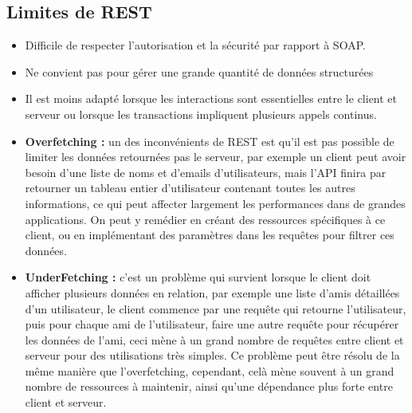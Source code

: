 \subsection{Limites de REST}
\begin{itemize}
	\item Difficile de respecter l'autorisation et la sécurité par rapport à SOAP.
	\item Ne convient pas pour gérer une grande quantité de données structurées
	\item Il est moins adapté lorsque les interactions sont essentielles entre le client et serveur ou lorsque les transactions impliquent plusieurs appels continus.
	\item \textbf{Overfetching :} un des inconvénients de REST est qu'il est pas possible de limiter les données retournées pas le serveur, par exemple un client peut avoir besoin d'une liste de noms et d'emails d'utilisateurs, mais l'API finira par retourner un tableau entier d'utilisateur contenant toutes les autres informations, ce qui peut affecter largement les performances dans de grandes applications. On peut y remédier en créant des ressources spécifiques à ce client, ou en implémentant des paramètres dans les requêtes pour filtrer ces données.
	\item \textbf{UnderFetching :} c'est un problème qui survient lorsque le client doit afficher plusieurs données en relation, par exemple une liste d'amis détaillées d'un utilisateur, le client commence par une requête qui retourne l'utilisateur, puis pour chaque ami de l'utilisateur, faire une autre requête pour récupérer les données de l'ami, ceci mène à un grand nombre de requêtes entre client et serveur pour des utilisations très simples.
	Ce problème peut être résolu de la même manière que l'overfetching, cependant, celà mène souvent à un grand nombre de ressources à maintenir, ainsi qu'une dépendance plus forte entre client et serveur.
\end{itemize}

